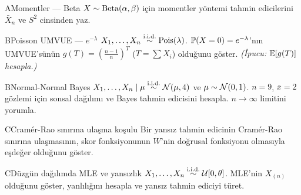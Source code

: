 \begin{alistirma}[Al.12.3]{A}{Momentler --- Beta}
$X\sim\operatorname{Beta}(\alpha,\beta)$ için momentler yöntemi tahmin edicilerini $\bar{X}_n$ ve $S^2$ cinsinden yaz.
\end{alistirma}
\begin{alistirma}[Al.12.4]{B}{Poisson UMVUE --- $e^{-\lambda}$}
$X_1,\ldots,X_n\overset{\text{i.i.d.}}{\sim}\operatorname{Pois}(\lambda)$. $\mathbb{P}(X=0)=e^{-\lambda}$'nın UMVUE'sünün $g(T)=\left(\frac{n-1}{n}\right)^T$ ($T=\sum X_i$) olduğunu göster. \textit{(İpucu: $\mathbb{E}[g(T)]$ hesapla.)}
\end{alistirma}
\alistirmalar



\begin{alistirma}[Al.12.5]{B}{Normal-Normal Bayes}
$X_1,\ldots,X_n\mid\mu\overset{\text{i.i.d.}}{\sim}\mathcal{N}(\mu,4)$ ve $\mu\sim\mathcal{N}(0,1)$. $n=9$, $\bar{x}=2$ gözlemi için sonsal dağılımı ve Bayes tahmin edicisini hesapla. $n\to\infty$ limitini yorumla.
\end{alistirma}

\begin{alistirma}[Al.12.6]{C}{Cramér-Rao sınırına ulaşma koşulu}
Bir yansız tahmin edicinin Cramér-Rao sınırına ulaşmasının, skor fonksiyonunun $W$'nin doğrusal fonksiyonu olmasıyla eşdeğer olduğunu göster.
\end{alistirma}

\begin{alistirma}[Al.12.7]{C}{Düzgün dağılımda MLE ve yansızlık}
$X_1,\ldots,X_n\overset{\text{i.i.d.}}{\sim}\mathcal{U}[0,\theta]$. MLE'nin $X_{(n)}$ olduğunu göster, yanlılığını hesapla ve yansız tahmin ediciyi türet.
\end{alistirma}

